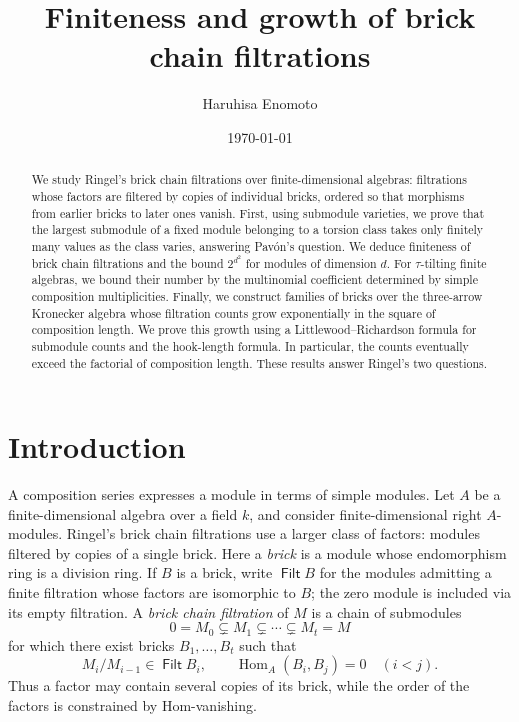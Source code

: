 \documentclass[a4paper,reqno,10pt]{amsart}
\title[Finiteness and growth of brick chain filtrations]
{Finiteness and growth of brick chain filtrations}
\author[H.\ Enomoto]{Haruhisa Enomoto}
\date{\today}
\theoremstyle{definition}
\numberwithin{equation}{section}
\newcommand{\Hom}{\operatorname{Hom}}
\DeclareMathOperator{\Filt}{\mathsf{Filt}}
\begin{document}
\begin{abstract}
We study Ringel's brick chain filtrations over finite-dimensional algebras:
filtrations whose factors are filtered by copies of individual bricks,
ordered so that morphisms from earlier bricks to later ones vanish.
First, using submodule varieties, we prove that the largest submodule of a
fixed module belonging to a torsion class takes only finitely many values
as the class varies, answering Pav\'on's question.
We deduce finiteness of brick chain filtrations and the bound $2^{d^2}$
for modules of dimension $d$.
For $\tau$-tilting finite algebras, we bound their number by the multinomial
coefficient determined by simple composition multiplicities.
Finally, we construct families of bricks over the three-arrow Kronecker
algebra whose filtration counts grow exponentially in the square of
composition length. We prove this growth using a Littlewood--Richardson
formula for submodule counts and the hook-length formula.
In particular, the counts eventually exceed the factorial of composition
length. These results answer Ringel's two questions.
\end{abstract}

\maketitle
\begingroup
\footnotesize
\setcounter{tocdepth}{2}
\tableofcontents
\endgroup
\enlargethispage{3pt}

\section{Introduction}

A composition series expresses a module in terms of simple modules. Let
$A$ be a finite-dimensional algebra over a field $k$,
and consider finite-dimensional right $A$-modules.
Ringel's brick chain filtrations use a larger class of factors: modules
filtered by copies of a single brick. Here a \emph{brick} is a module
whose endomorphism ring is a division ring. If $B$ is a brick, write
$\Filt B$ for the modules admitting a finite filtration whose factors are
isomorphic to $B$; the zero module is included via its empty filtration.
A \emph{brick chain filtration} of $M$ is a chain of submodules
\[
 0=M_0\subsetneq M_1\subsetneq\cdots\subsetneq M_t=M
\]
for which there exist bricks $B_1,\ldots,B_t$ such that
\[
 M_i/M_{i-1}\in\Filt B_i,\qquad
 \Hom_A(B_i,B_j)=0\quad(i<j).
\]
Thus a factor may contain several copies of its brick, while the order
of the factors is constrained by Hom-vanishing.
\end{document}
